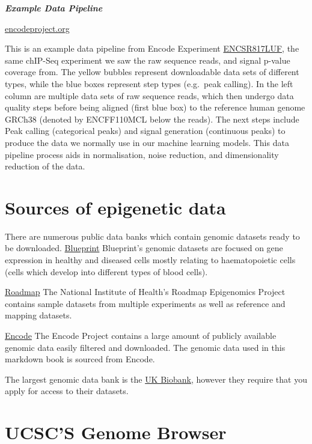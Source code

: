 \documentclass[
]{book}
\begin{document}
\textbf{\emph{Example Data Pipeline}}

\href{https://www.encodeproject.org/experiments/ENCSR817LUF/}{encodeproject.org}

This is an example data pipeline from Encode Experiment \href{https://www.encodeproject.org/experiments/ENCSR817LUF/}{ENCSR817LUF}, the same chIP-Seq experiment we saw the raw sequence reads, and signal p-value coverage from. The yellow bubbles represent downloadable data sets of different types, while the blue boxes represent step types (e.g.~peak calling). In the left column are multiple data sets of raw sequence reads, which then undergo data quality steps before being aligned (first blue box) to the reference human genome GRCh38 (denoted by ENCFF110MCL below the reads). The next steps include Peak calling (categorical peaks) and signal generation (continuous peaks) to produce the data we normally use in our machine learning models. This data pipeline process aids in normalisation, noise reduction, and dimensionality reduction of the data.

\section{Sources of epigenetic data}\label{sources-of-epigenetic-data}

There are numerous public data banks which contain genomic datasets ready to be downloaded.
\href{https://projects.ensembl.org/blueprint/}{Blueprint}
Blueprint's genomic datasets are focused on gene expression in healthy and diseased cells mostly relating to haematopoietic cells (cells which develop into different types of blood cells).

\href{https://www.ncbi.nlm.nih.gov/geo/roadmap/epigenomics/}{Roadmap}
The National Institute of Health's Roadmap Epigenomics Project contains sample datasets from multiple experiments as well as reference and mapping datasets.

\href{https://www.encodeproject.org/}{Encode}
The Encode Project contains a large amount of publicly available genomic data easily filtered and downloaded. The genomic data used in this markdown book is sourced from Encode.

The largest genomic data bank is the \href{https://www.ukbiobank.ac.uk/}{UK Biobank}, however they require that you apply for access to their datasets.

\section{UCSC'S Genome Browser}\label{ucscs-genome-browser}
\end{document}
